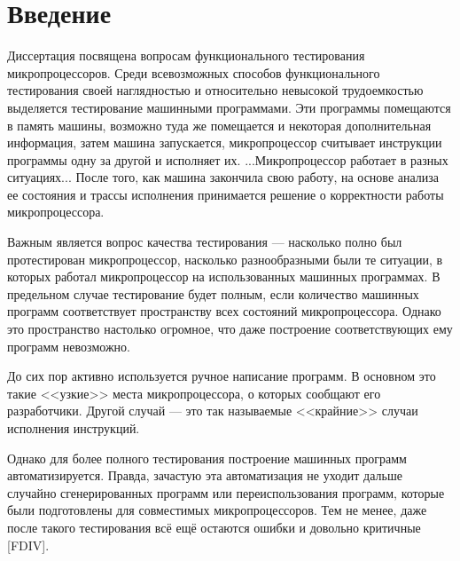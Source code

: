 \chapter*{Введение}

%
%
%
%

Диссертация посвящена вопросам функционального тестирования
микропроцессоров. Среди всевозможных способов функционального
тестирования своей наглядностью и относительно невысокой
трудоемкостью выделяется тестирование машинными программами. Эти
программы помещаются в память машины, возможно туда же помещается и
некоторая дополнительная информация, затем машина запускается,
микропроцессор считывает инструкции программы одну за другой и
исполняет их. ...Микропроцессор работает в разных ситуациях... После
того, как машина закончила свою работу, на основе анализа ее
состояния и трассы исполнения принимается решение о корректности
работы микропроцессора.

Важным является вопрос качества тестирования --- насколько полно был
протестирован микропроцессор, насколько разнообразными были те
ситуации, в которых работал микропроцессор на использованных
машинных программах. В предельном случае тестирование будет полным,
если количество машинных программ соответствует пространству всех
состояний микропроцессора. Однако это пространство настолько
огромное, что даже построение соответствующих ему программ
невозможно.

До сих пор активно используется ручное написание программ. В
основном это такие <<узкие>> места микропроцессора, о которых
сообщают его разработчики. Другой случай --- это так называемые
<<крайние>> случаи исполнения инструкций.

Однако для более полного тестирования построение машинных программ
автоматизируется. Правда, зачастую эта автоматизация не уходит
дальше случайно сгенерированных программ или переиспользования
программ, которые были подготовлены для совместимых
микропроцессоров. Тем не менее, даже после такого тестирования всё
ещё остаются ошибки и довольно критичные [FDIV].

